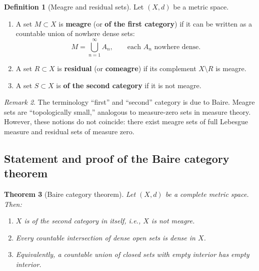 \documentclass[a4paper,12pt]{book}
\theoremstyle{definition}
\newtheorem{definition}{Definition}[chapter]
\theoremstyle{plain}
\newtheorem{theorem}[definition]{Theorem}
\theoremstyle{remark}
\newtheorem{remark}[definition]{Remark}
\begin{document}
\begin{definition}[Meagre and residual sets]\label{def:meagre}
Let $(X,d)$ be a metric space.
\begin{enumerate}[label=(\roman*)]
  \item A set $M \subset X$ is \textbf{meagre} (or \textbf{of the first category})
    if it can be written as a countable union of nowhere dense sets:
    \[
      M = \bigcup_{n=1}^{\infty} A_n, \qquad \text{each } A_n \text{ nowhere dense.}
    \]
  \item A set $R \subset X$ is \textbf{residual} (or \textbf{comeagre}) if its
    complement $X \setminus R$ is meagre.
  \item A set $S \subset X$ is \textbf{of the second category} if it is not meagre.
\end{enumerate}
\end{definition}

\begin{remark}\label{rem:category-terminology}
The terminology ``first'' and ``second'' category is due to Baire. Meagre sets are
``topologically small,'' analogous to measure-zero sets in measure theory. However,
these notions do not coincide: there exist meagre sets of full Lebesgue measure and
residual sets of measure zero.
\end{remark}

\subsection{Statement and proof of the Baire category theorem}

\begin{theorem}[Baire category theorem]\label{thm:baire}
Let $(X,d)$ be a complete metric space. Then:
\begin{enumerate}[label=(\alph*)]
  \item $X$ is of the second category in itself, i.e., $X$ is not meagre.
  \item Every countable intersection of dense open sets is dense in $X$.
  \item Equivalently, a countable union of closed sets with empty interior has
    empty interior.
\end{enumerate}
\end{theorem}
\end{document}
